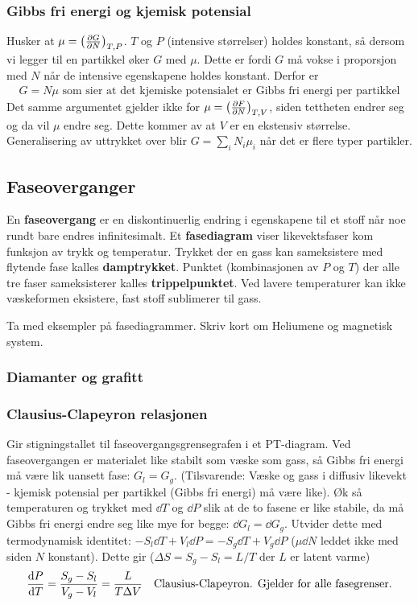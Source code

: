 \documentclass[12pt]{article}
\begin{document}
\subsubsection{Gibbs fri energi og kjemisk potensial}
Husker at $\mu = \left(\pdv{G}{N}\right)_{T,P}$. $T$ og $P$ (intensive størrelser) holdes
konstant, så dersom vi legger til en partikkel øker $G$ med $\mu$. Dette er fordi $G$ må
vokse i proporsjon med $N$ når de intensive egenskapene holdes konstant. Derfor er
\begin{align*}
  G = N \mu \text{ som sier at det kjemiske potensialet er Gibbs fri energi per partikkel}
\end{align*}
Det samme argumentet gjelder ikke for $\mu = \left(\pdv{F}{N}\right)_{T,V}$, siden
tettheten endrer seg og da vil $\mu$ endre seg. Dette kommer av at $V$ er en ekstensiv størrelse.
Generalisering av uttrykket over blir $G = \sum_i N_i \mu_i$ når det er flere typer partikler.
\subsection{Faseoverganger}
En \textbf{faseovergang} er en diskontinuerlig endring i egenskapene til et stoff
når noe rundt bare endres infinitesimalt. Et \textbf{fasediagram} viser likevektsfaser
kom funksjon av trykk og temperatur. Trykket der en gass kan sameksistere med flytende
fase kalles \textbf{damptrykket}. Punktet (kombinasjonen av $P$ og $T$) der
alle tre faser sameksisterer kalles \textbf{trippelpunktet}. Ved lavere temperaturer
kan ikke væskeformen eksistere, fast stoff sublimerer til gass.

Ta med eksempler på fasediagrammer. Skriv kort om Heliumene og magnetisk system.
\subsubsection{Diamanter og grafitt}

\subsubsection{Clausius-Clapeyron relasjonen}
Gir stigningstallet til faseovergangsgrensegrafen i et PT-diagram. Ved faseovergangen
er materialet like stabilt som væske som gass, så Gibbs fri energi må være lik uansett
fase: $G_l = G_g$. (Tilsvarende: Væske og gass i diffusiv likevekt - kjemisk potensial per partikkel
(Gibbs fri energi) må være like).
Øk så temperaturen og trykket med $\dd T$ og $\dd P$ slik at de to fasene er like
stabile, da må Gibbs fri energi endre seg like mye for begge: $\dd G_l = \dd G_g$.
Utvider dette med termodynamisk identitet: $-S_l \dd T + V_l \dd P = -S_g \dd T + V_g \dd P$
($\mu \dd N$ leddet ikke med siden $N$ konstant). Dette gir ($\Delta S = S_g - S_l = L/T$ der $L$ er latent varme)
\begin{align*}
  \dv{P}{T} = \frac{S_g - S_l}{V_g - V_l} = \frac{L}{T \Delta V} \quad \text{Clausius-Clapeyron. Gjelder for alle fasegrenser.}
\end{align*}
\end{document}
